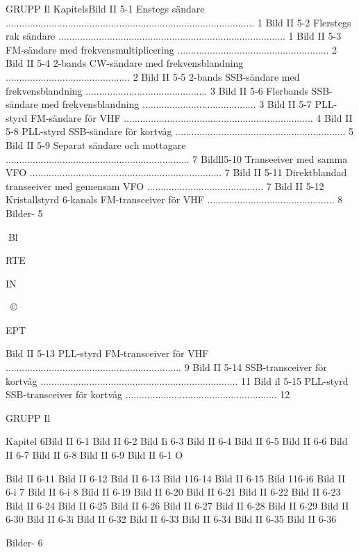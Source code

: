 \documentclass[a4paper,twoside,twocolumn,openright]{book}
\begin{document}
{{{{{{{{{{{GRUPP Il
KapitelsBild II 5-1
Enstegs sändare ............................................................................................ 1
Bild II 5-2
Flerstegs rak sändare .................................................................................... 1
Bild II 5-3
FM-sändare med frekvensmultiplicering ........................................................ 2
Bild II 5-4
2-bands CW-sändare med frekvensblandning .............................................. 2
Bild II 5-5
2-bands SSB-sändare med frekvensblandning ............................................. 3
Bild II 5-6
Flerbands SSB-sändare med frekvensblandning .......................................... 3
Bild II 5-7
PLL-styrd FM-sändare för VHF ...................................................................... 4
Bild II 5-8
PLL-styrd SSB-sändare för kortvåg ............................................................... 5
Bild II 5-9
Separat sändare och mottagare .................................................................... 7
Bildll5-10 Transeeiver med samma VFO ....................................................................... 7
Bild II 5-11 Direktblandad transeeiver med gemensam VFO ........................................... 7
Bild II 5-12 Kristallstyrd 6-kanals FM-transceiver för VHF ............................................... 8
Bilder- 5

Bl

RTE

IN

~©~

EPT

Bild II 5-13 PLL-styrd FM-transceiver för VHF ................................................................. 9
Bild II 5-14 SSB-transceiver för kortvåg ......................................................................... 11
Bild il 5-15 PLL-styrd SSB-transceiver för kortvåg ........................................................ 12

GRUPP Il

Kapitel 6Bild II 6-1
Bild II 6-2
Bild Ii 6-3
Bild II 6-4
Bild II 6-5
Bild II 6-6
Bild II 6-7
Bild II 6-8
Bild II 6-9
Bild II 6-1 O

Bild II 6-11
Bild II 6-12
Bild II 6-13
Bild 116-14
Bild II 6-15
Bild 116-i6
Bild II 6-i 7
Bild II 6-i 8
Bild II 6-19
Bild II 6-20
Bild II 6-21
Bild II 6-22
Bild II 6-23
Bild II 6-24
Bild II 6-25
Bild II 6-26
Bild II 6-27
Bild II 6-28
Bild II 6-29
Bild II 6-30
Bild II 6-3i
Bild II 6-32
Bild II 6-33
Bild II 6-34
Bild II 6-35
Bild II 6-36

Bilder- 6

}}}}}}}}}}}
\end{document}
